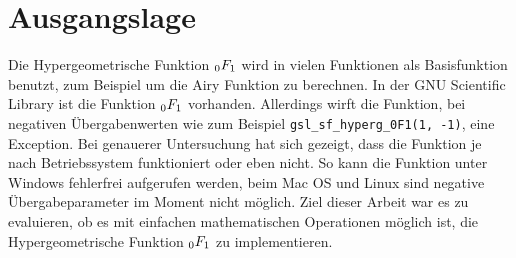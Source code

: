 %
%
%
\section{Ausgangslage\label{0f1:section:ausgangslage}}
Die Hypergeometrische Funktion $\mathstrut_0F_1$ wird in vielen Funktionen als Basisfunktion benutzt, 
zum Beispiel um die Airy Funktion zu berechnen. 
In der GNU Scientific Library \cite{0f1:library-gsl} 
ist die Funktion $\mathstrut_0F_1$ vorhanden. 
Allerdings wirft die Funktion, bei negativen Übergabenwerten wie zum Beispiel \verb+gsl_sf_hyperg_0F1(1, -1)+, eine Exception. 
Bei genauerer Untersuchung hat sich gezeigt, dass die Funktion je nach Betriebssystem funktioniert oder eben nicht. 
So kann die Funktion unter Windows fehlerfrei aufgerufen werden, beim Mac OS und Linux sind negative Übergabeparameter im Moment nicht möglich.
Ziel dieser Arbeit war es zu evaluieren, ob es mit einfachen mathematischen Operationen möglich ist, die Hypergeometrische Funktion $\mathstrut_0F_1$ zu implementieren.
